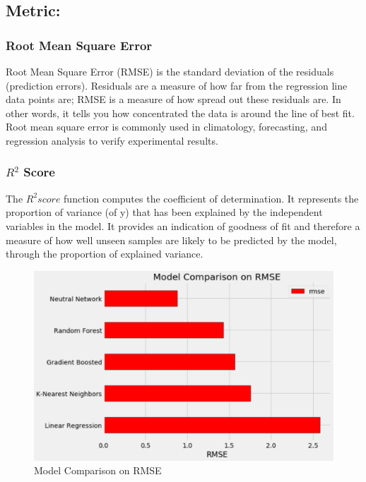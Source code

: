 \documentclass{article}
\begin{document}
\subsection*{Metric:}
\subsubsection*{Root Mean Square Error}
Root Mean Square Error (RMSE) is the standard deviation of the residuals (prediction errors). Residuals are a measure of how far from the regression line data points are; RMSE is a measure of how spread out these residuals are. In other words, it tells you how concentrated the data is around the line of best fit. Root mean square error is commonly used in climatology, forecasting, and regression analysis to verify experimental results.

\subsubsection*{$R^2$ Score}
The $R^2score$ function computes the coefficient of determination. It represents the proportion of variance (of y) that has been explained by the independent variables in the model. It provides an indication of goodness of fit and therefore a measure of how well unseen samples are likely to be predicted by the model, through the proportion of explained variance.

\begin{figure}[!htb]
	\centering
    \includegraphics[scale=0.35]{rmse.png}
    \caption{Model Comparison on RMSE}\label{fig1}
\end{figure}
\end{document}
